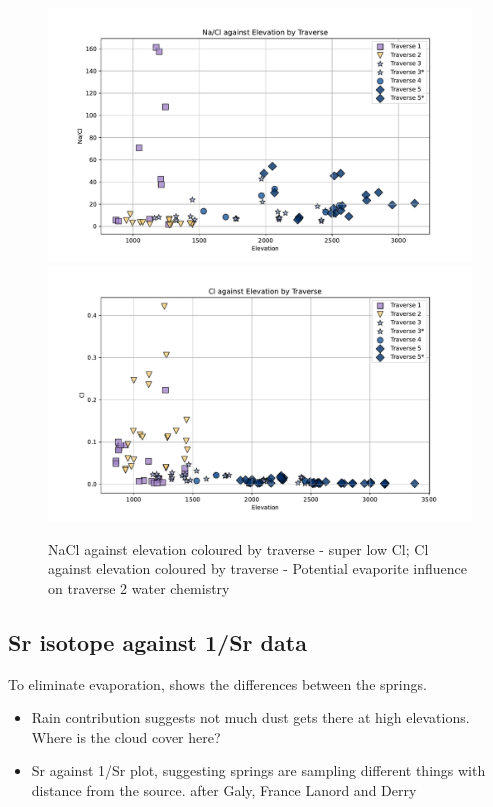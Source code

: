 \begin{figure}[h]
    \centering
    \includegraphics[width=\textwidth]{NaClEl.pdf}
    \includegraphics[width=\textwidth]{ClEl.pdf}
    \caption{NaCl against elevation coloured by traverse -  super low Cl; Cl against elevation coloured by traverse - Potential evaporite influence on traverse 2 water chemistry}
    \label{fig:spatial_changes_spring5}
\end{figure}

\FloatBarrier



\subsection{Sr isotope against 1/Sr data}
To eliminate evaporation, shows the differences between the springs.


\begin{itemize}
    \item Rain contribution suggests not much dust gets there at high elevations. Where is the cloud cover here?
    \item Sr against 1/Sr plot, suggesting springs are sampling different things with distance from the source. after Galy, France Lanord and Derry
\end{itemize}

